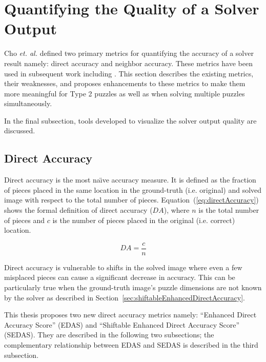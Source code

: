 \documentclass{report}
\def\eref#1{(\ref{#1})}
\begin{document}
\pagebreak
\section{Quantifying the Quality of a Solver Output}\label{sec:quantifyingSolverQuantify}

Cho \textit{et. al.} \cite{cho2010} defined two primary metrics for quantifying the accuracy of a solver result namely: direct accuracy and neighbor accuracy. These metrics have been used in subsequent work including \cite{sholomon2013, pomeranz2011, paikin2015, son2014, gallagher2012}.  This section describes the existing metrics, their weaknesses, and proposes enhancements to these metrics to make them more meaningful for Type 2 puzzles as well as when solving multiple puzzles simultaneously.

In the final subsection, tools developed to visualize the solver output quality are discussed.

\subsection{Direct Accuracy}\label{sec:directAccuracy}

Direct accuracy is the most na\"{\i}ve accuracy measure.  It is defined as the fraction of pieces placed in the same location in the ground-truth (i.e. original) and solved image with respect to the total number of pieces.  Equation~\eref{eq:directAccuracy} shows the formal definition of direct accuracy ($DA$), where $n$ is the total number of pieces and $c$ is the number of pieces placed in the original (i.e. correct) location.

\begin{equation} \label{eq:directAccuracy}
DA = \frac{c}{n}
\end{equation}

Direct accuracy is vulnerable to shifts in the solved image where even a few misplaced pieces can cause a significant decrease in accuracy.  This can be particularly true when the ground-truth image's puzzle dimensions are not known by the solver as described in Section~\ref{sec:shiftableEnhancedDirectAccuracy}.

This thesis proposes two new direct accuracy metrics namely: ``Enhanced Direct Accuracy Score'' (EDAS) and ``Shiftable Enhanced Direct Accuracy Score'' (SEDAS).  They are described in the following two subsections; the complementary relationship between EDAS and SEDAS is described in the third subsection.
\end{document}
